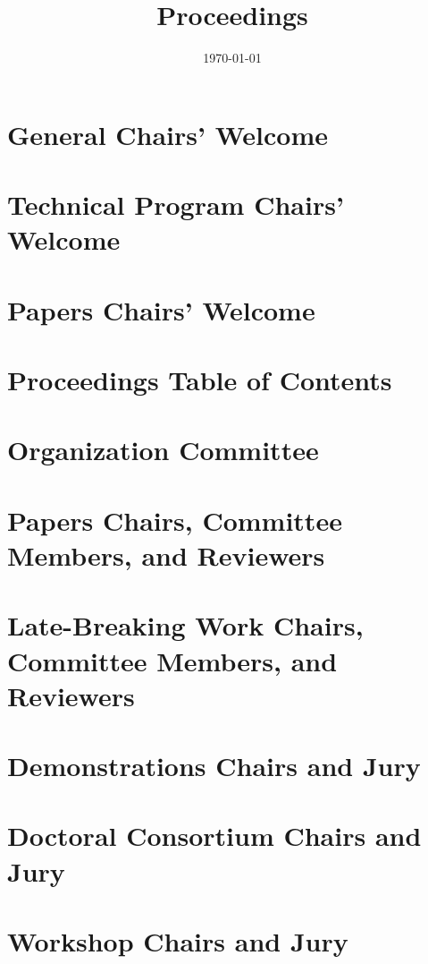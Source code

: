 \documentclass[10pt, letterpaper]{article}
\title{\conferenceAcronym Proceedings}
\author{}
\date{\today}
\begin{document}




\section{General Chairs' Welcome}

\newpage

\section{Technical Program Chairs' Welcome}

\newpage

\section{Papers Chairs' Welcome}

\newpage

\section{Proceedings Table of Contents}

\newpage

\section{Organization Committee}

\newpage


\section{Papers Chairs, Committee Members, and Reviewers}

\newpage

\section{Late-Breaking Work Chairs, Committee Members, and Reviewers}

\newpage

\section{Demonstrations Chairs and Jury}

\newpage

\section{Doctoral Consortium Chairs and Jury}

\newpage

\section{Workshop Chairs and Jury}

\newpage


\end{document}

